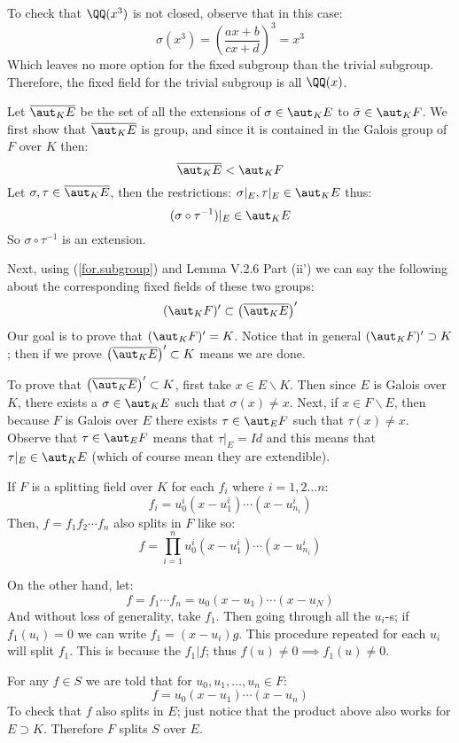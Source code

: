 To check that $\QQ(x^3)$ is not closed, observe that in this case:
$$\sigma(x^3) = \left( \frac{ax+b}{cx+d}\right)^3=x^3$$
Which leaves no more option for the fixed subgroup than the trivial subgroup. Therefore, the fixed field for the trivial subgroup is all $\QQ(x)$.

Let $\overline{\aut_K E}$ be the set of all the extensions of $\sigma\in \aut_KE$ to $\bar\sigma\in \aut_KF$. We first show that $\overline{\aut_K E}$ is group, and since it is contained in the Galois group of $F$ over $K$ then:
\begin{equation}\label{for.subgroup}
\overline{\aut_K E}<\aut_KF
\end{equation}
Let $\sigma, \tau \in \overline{\aut_K E}$, then the restrictions: $\sigma|_E,\tau|_E\in \aut_KE$ thus:
$$(\sigma\circ\tau^{-1})|_E\in \aut_KE$$
So $\sigma\circ\tau^{-1}$ is an extension.

Next, using (\ref{for.subgroup}) and Lemma V.2.6 Part (ii') we can say the following about the corresponding fixed fields of these two groups:
$$(\aut_KF)' \subset \left(\overline{\aut_K E}\right)'$$
Our goal is to prove that $(\aut_KF)'=K$. Notice that in general $(\aut_KF)'\supset K$; then if we prove $\left(\overline{\aut_K E}\right)'\subset K$ means we are done.

To prove that $\left(\overline{\aut_K E}\right)'\subset K$, first take $x\in E\backslash K$. Then since $E$ is Galois over $K$, there exists a $\sigma\in \aut_KE$ such that $\sigma(x)\neq x$. Next, if $x\in F\backslash E$, then because $F$ is Galois over $E$ there exists $\tau\in \aut_EF$ such that $\tau(x)\neq x$. Observe that $\tau\in \aut_EF$ means that $\tau|_E= Id$ and this means that $\tau|_E\in \aut_KE$ (which of course mean they are extendible).

If $F$ is a splitting field over $K$  for each $f_i$ where $i=1,2\ldots n$:
$$f_i = u_0^i(x-u_1^i)\cdots (x-u_{n_i}^i)$$
Then,  $f=f_1f_2\cdots f_n$ also splits in $F$ like so:
$$f=\prod_{i=1}^n u_0^i(x-u_1^i)\cdots (x-u_{n_i}^i)$$

On the other hand, let:
$$f= f_1\cdots f_n =  u_0(x-u_1)\cdots (x-u_N)$$
And without loss of generality, take $f_1$. 
Then going through all the $u_i$-s; if $f_1(u_i)=0$ we can write $f_1 = (x-u_i)g$. 
This procedure repeated for each $u_i$ will split $f_1$. 
This is because the $f_1|f$; thus $f(u)\neq 0 \implies f_1(u)\neq 0$.

For any $f\in S$ we are told that for $u_0,u_1,\ldots, u_n\in F$:
$$f=u_0(x-u_1)\cdots (x-u_n)$$
To check that $f$ also splits in $E$; just notice that the product above also works for $E\supset K$. 
Therefore $F$ splits $S$ over $E$.

